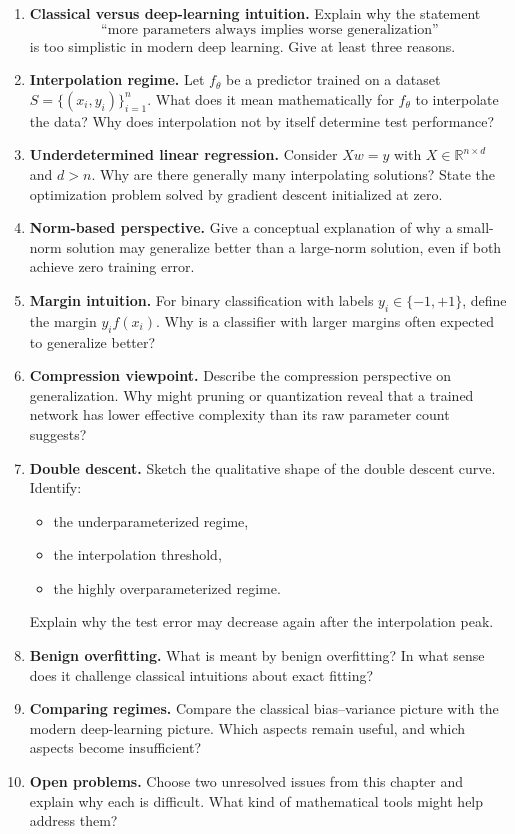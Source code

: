 \begin{enumerate}
    \item \textbf{Classical versus deep-learning intuition.}
    Explain why the statement
    \[
    \text{``more parameters always implies worse generalization''}
    \]
    is too simplistic in modern deep learning. Give at least three reasons.

    \item \textbf{Interpolation regime.}
    Let \(f_\theta\) be a predictor trained on a dataset \(S=\{(x_i,y_i)\}_{i=1}^n\). What does it mean mathematically for \(f_\theta\) to interpolate the data? Why does interpolation not by itself determine test performance?

    \item \textbf{Underdetermined linear regression.}
    Consider \(Xw=y\) with \(X \in \mathbb{R}^{n\times d}\) and \(d>n\). Why are there generally many interpolating solutions? State the optimization problem solved by gradient descent initialized at zero.

    \item \textbf{Norm-based perspective.}
    Give a conceptual explanation of why a small-norm solution may generalize better than a large-norm solution, even if both achieve zero training error.

    \item \textbf{Margin intuition.}
    For binary classification with labels \(y_i\in\{-1,+1\}\), define the margin \(y_i f(x_i)\). Why is a classifier with larger margins often expected to generalize better?

    \item \textbf{Compression viewpoint.}
    Describe the compression perspective on generalization. Why might pruning or quantization reveal that a trained network has lower effective complexity than its raw parameter count suggests?

    \item \textbf{Double descent.}
    Sketch the qualitative shape of the double descent curve. Identify:
    \begin{itemize}
        \item the underparameterized regime,
        \item the interpolation threshold,
        \item the highly overparameterized regime.
    \end{itemize}
    Explain why the test error may decrease again after the interpolation peak.

    \item \textbf{Benign overfitting.}
    What is meant by benign overfitting? In what sense does it challenge classical intuitions about exact fitting?

    \item \textbf{Comparing regimes.}
    Compare the classical bias--variance picture with the modern deep-learning picture. Which aspects remain useful, and which aspects become insufficient?

    \item \textbf{Open problems.}
    Choose two unresolved issues from this chapter and explain why each is difficult. What kind of mathematical tools might help address them?
\end{enumerate}